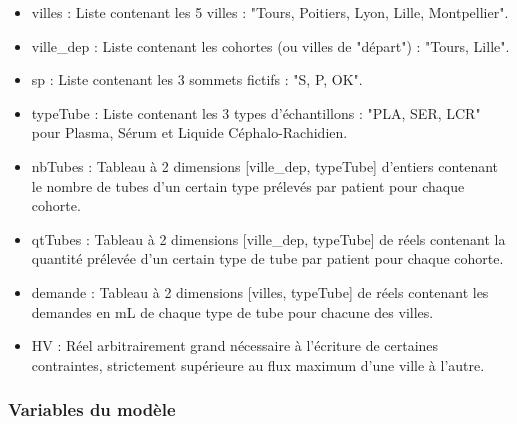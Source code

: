 \documentclass{polytech/polytech}
\numberwithin{figure}{chapter}
\begin{document}
\begin{itemize}
	\item villes : Liste contenant les 5 villes : "Tours, Poitiers, Lyon, Lille, Montpellier".
	\item ville\_dep : Liste contenant les cohortes (ou villes de "départ") : "Tours, Lille".
	\item sp : Liste contenant les 3 sommets fictifs : "S, P, OK".
	\item typeTube : Liste contenant les 3 types d'échantillons : "PLA, SER, LCR" pour Plasma, Sérum et Liquide Céphalo-Rachidien.
	\item nbTubes : Tableau à 2 dimensions [ville\_dep, typeTube] d'entiers contenant le nombre de tubes d'un certain type prélevés par patient pour chaque cohorte.
	\item qtTubes : Tableau à 2 dimensions [ville\_dep, typeTube] de réels contenant la quantité prélevée d'un certain type de tube par patient pour chaque cohorte.
	\item demande : Tableau à 2 dimensions [villes, typeTube] de réels contenant les demandes en mL de chaque type de tube pour chacune des villes.
	\item HV : Réel arbitrairement grand nécessaire à l'écriture de certaines contraintes, strictement supérieure au flux maximum d'une ville à l'autre.
\end{itemize}

\subsubsection{Variables du modèle}
\end{document}
